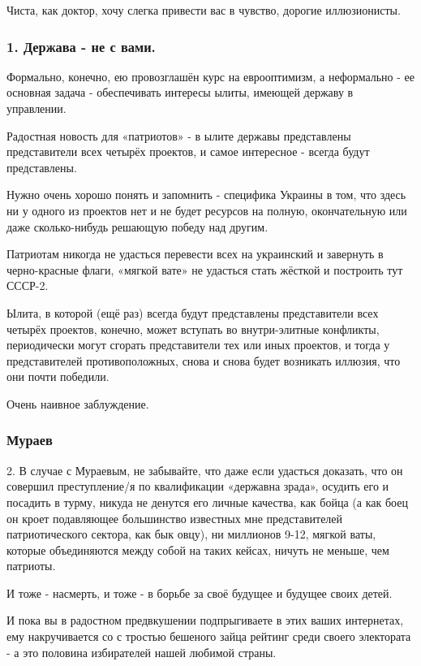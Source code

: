 Чиста, как доктор, хочу слегка привести вас в чувство, дорогие иллюзионисты.

\subsubsection{1. Держава - не с вами.}

Формально, конечно, ею провозглашён курс на еврооптимизм, а неформально - ее
основная задача - обеспечивать интересы ылиты, имеющей державу в управлении.

Радостная новость для «патриотов» - в ылите державы представлены представители
всех четырёх проектов, и самое интересное - всегда будут представлены.

Нужно очень хорошо понять и запомнить - специфика Украины в том, что здесь ни у
одного из проектов нет и не будет ресурсов на полную, окончательную или даже
сколько-нибудь решающую победу над другим.

Патриотам никогда не удасться перевести всех на украинский и завернуть в
черно-красные флаги, «мягкой вате» не удасться стать жёсткой и построить тут
СССР-2.

Ылита, в которой (ещё раз) всегда будут представлены представители всех четырёх
проектов, конечно, может вступать во внутри-элитные конфликты, периодически
могут сгорать представители тех или иных проектов, и тогда у представителей
противоположных, снова и снова будет возникать иллюзия, что они почти победили.

Очень наивное заблуждение.

\subsubsection{Мураев}

2. В случае с Мураевым, не забывайте, что даже если удасться доказать, что он
совершил преступление/я по квалификации «державна зрада», осудить его и
посадить в турму, никуда не денутся его личные качества, как бойца (а как боец
он кроет подавляющее большинство известных мне представителей патриотического
сектора, как бык овцу), ни миллионов 9-12, мягкой ваты, которые объединяются
между собой на таких кейсах, ничуть не меньше, чем патриоты.

И тоже - насмерть, и тоже - в борьбе за своё будущее и будущее своих детей.

И пока вы в радостном предвкушении подпрыгиваете в этих ваших интернетах, ему
накручивается со с тростью бешеного зайца рейтинг среди своего электората - а
это половина избирателей нашей любимой страны.

